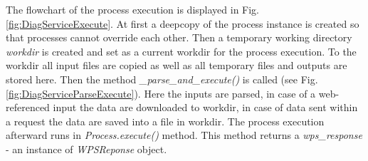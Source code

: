 \begin{figure}[h!]
\centering
\begin{floatrow}
\end{floatrow}
\end{figure}

The flowchart of the process execution is displayed in Fig. \ref{fig:DiagServiceExecute}. 
At first a deepcopy of the process instance is created so that processes cannot override each other. Then a temporary working directory \textit{workdir} is created and set as a current workdir for the process execution. To the workdir all input files are
copied as well as all temporary files and outputs are stored here. Then the method \textit{\_parse\_and\_execute()} is called (see
Fig. \ref{fig:DiagServiceParseExecute}). Here the inputs are parsed, in case of a web-referenced input the data are downloaded to workdir, in case of data sent within a request the data are saved into a file in workdir. The process execution afterward runs in \textit{Process.execute()} method. This method returns a \textit{wps\_response} - an instance of \textit{WPSReponse} object.


